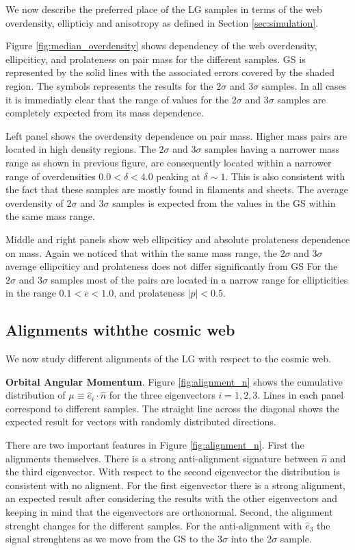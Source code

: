 \documentclass{emulateapj}
\begin{document}
We now describe the preferred place of the LG samples in terms of the
web overdensity, ellipticiy and anisotropy as defined in Section
\ref{sec:simulation}. 

Figure \ref{fig:median_overdensity} shows dependency of the web overdensity,
ellipciticy, and prolateness on pair mass for the different samples.
GS is represented by the solid lines with the associated 
errors covered by the shaded region. 
The symbols represents the results for the $2\sigma$ and $3\sigma$
samples.  
In all cases it is immediatly clear that the range of values for the
$2\sigma$ and $3\sigma$ samples are completely expected from its mass
dependence.  

Left panel shows the overdensity dependence on pair mass. 
Higher mass pairs are located in high density regions.
The $2\sigma$ and $3\sigma$ samples having a narrower mass range as 
shown in previous figure, are consequently located within a narrower 
range of overdensities $0.0<\delta<4.0$ peaking at $\delta \sim 1$. 
This is also consistent with the fact that these samples are mostly 
found in filaments and sheets. 
The average overdensity of $2\sigma$ and $3\sigma$ samples is expected
from the values in the GS within the same mass range.

Middle and right panels show web ellipciticy and absolute prolateness
dependence on mass. Again we noticed that within the same mass range,
the $2\sigma$ and $3\sigma$ average ellipciticy and prolateness does not
differ significantly from GS
For the $2\sigma$ and $3\sigma$ samples most of the pairs are located
in a narrow range for ellipticities in the range $0.1<e<1.0$, and
prolateness $|p|<0.5$.


\subsection{Alignments withthe cosmic web}

We now study different alignments of the LG with respect to the cosmic web. 

{\bf Orbital Angular Momentum}. Figure \ref{fig:alignment_n} shows the
cumulative distribution of $\mu\equiv\hat{e}_i\cdot\hat{n}$  for the
three eigenvectors $i=1,2,3$.    
Lines in each panel correspond to different samples.
The straight line across the diagonal shows the expected
result for vectors with randomly distributed directions.


There are two important features in Figure \ref{fig:alignment_n}.
First the alignments themselves. 
There is a strong anti-alignment signature between $\hat{n}$ and the
third eigenvector. 
With respect to the second eigenvector the distribution is consistent
with no aligment. 
For the first eigenvector there is a strong alignment, an expected
result after considering the results with the other eigenvectors and
keeping in mind that the eigenvectors are orthonormal.
Second, the alignment strenght changes for the different samples. 
For the anti-alignment with $\hat{e}_3$ the signal strenghtens as we
move from the GS to the 3$\sigma$ into the 2$\sigma$ sample.
\end{document}
